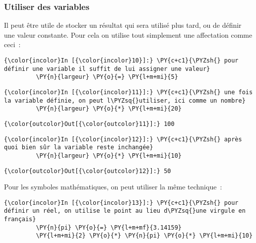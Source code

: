     \hypertarget{utiliser-des-variables}{%
\subsubsection{Utiliser des variables}\label{utiliser-des-variables}}

    Il peut être utile de stocker un résultat qui sera utilisé plus tard, ou
de définir une valeur constante. Pour cela on utilise tout simplement
une affectation comme ceci~:

    \begin{Verbatim}[commandchars=\\\{\}]
{\color{incolor}In [{\color{incolor}10}]:} \PY{c+c1}{\PYZsh{} pour définir une variable il suffit de lui assigner une valeur}
         \PY{n}{largeur} \PY{o}{=} \PY{l+m+mi}{5}
\end{Verbatim}


    \begin{Verbatim}[commandchars=\\\{\}]
{\color{incolor}In [{\color{incolor}11}]:} \PY{c+c1}{\PYZsh{} une fois la variable définie, on peut l\PYZsq{}utiliser, ici comme un nombre}
         \PY{n}{largeur} \PY{o}{*} \PY{l+m+mi}{20}
\end{Verbatim}


\begin{Verbatim}[commandchars=\\\{\}]
{\color{outcolor}Out[{\color{outcolor}11}]:} 100
\end{Verbatim}
            
    \begin{Verbatim}[commandchars=\\\{\}]
{\color{incolor}In [{\color{incolor}12}]:} \PY{c+c1}{\PYZsh{} après quoi bien sûr la variable reste inchangée}
         \PY{n}{largeur} \PY{o}{*} \PY{l+m+mi}{10}
\end{Verbatim}


\begin{Verbatim}[commandchars=\\\{\}]
{\color{outcolor}Out[{\color{outcolor}12}]:} 50
\end{Verbatim}
            
    Pour les symboles mathématiques, on peut utiliser la même technique~:

    \begin{Verbatim}[commandchars=\\\{\}]
{\color{incolor}In [{\color{incolor}13}]:} \PY{c+c1}{\PYZsh{} pour définir un réel, on utilise le point au lieu d\PYZsq{}une virgule en français}
         \PY{n}{pi} \PY{o}{=} \PY{l+m+mf}{3.14159}
         \PY{l+m+mi}{2} \PY{o}{*} \PY{n}{pi} \PY{o}{*} \PY{l+m+mi}{10}
\end{Verbatim}


